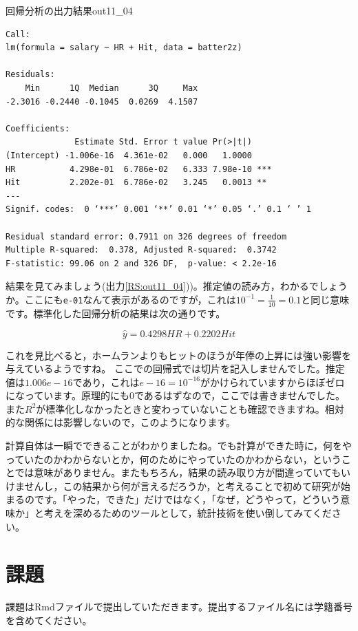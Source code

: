\documentclass{ltjbook}
\begin{document}
\begin{Rscreen}{回帰分析の出力結果}{out11_04}
	\begin{verbatim}
Call:
lm(formula = salary ~ HR + Hit, data = batter2z)

Residuals:
    Min      1Q  Median      3Q     Max 
-2.3016 -0.2440 -0.1045  0.0269  4.1507 

Coefficients:
              Estimate Std. Error t value Pr(>|t|)    
(Intercept) -1.006e-16  4.361e-02   0.000   1.0000    
HR           4.298e-01  6.786e-02   6.333 7.98e-10 ***
Hit          2.202e-01  6.786e-02   3.245   0.0013 ** 
---
Signif. codes:  0 ‘***’ 0.001 ‘**’ 0.01 ‘*’ 0.05 ‘.’ 0.1 ‘ ’ 1

Residual standard error: 0.7911 on 326 degrees of freedom
Multiple R-squared:  0.378,	Adjusted R-squared:  0.3742 
F-statistic: 99.06 on 2 and 326 DF,  p-value: < 2.2e-16
\end{verbatim}
\end{Rscreen}

結果を見てみましょう(出力\ref{RS:out11_04}))。推定値の読み方，わかるでしょうか。ここにも\verb|e-01|なんて表示があるのですが，これは$10^{-1}=\frac{1}{10}=0.1$と同じ意味です。標準化した回帰分析の結果は次の通りです。

\[ \hat{y} = 0.4298 HR + 0.2202 Hit \]

これを見比べると，ホームランよりもヒットのほうが年俸の上昇には強い影響を与えているようですね。
ここでの回帰式では切片を記入しませんでした。推定値は$1.006e-16$であり，これは$e-16=10^{-16}$がかけられていますからほぼゼロになっています。原理的にも$0$であるはずなので，ここでは書きませんでした。
また$R^2$が標準化しなかったときと変わっていないことも確認できますね。相対的な関係には影響しないので，このようになります。

計算自体は一瞬でできることがわかりましたね。でも計算ができた時に，何をやっていたのかわからないとか，何のためにやっていたのかわからない，ということでは意味がありません。またもちろん，結果の読み取り方が間違っていてもいけませんし，この結果から何が言えるだろうか，と考えることで初めて研究が始まるのです。「やった，できた」だけではなく，「なぜ，どうやって，どういう意味か」と考えを深めるためのツールとして，統計技術を使い倒してみてください。

\section{課題}
課題はRmdファイルで提出していただきます。提出するファイル名には学籍番号を含めてください。
\end{document}
